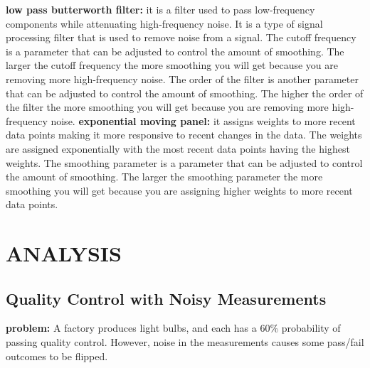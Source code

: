 \documentclass[a4paper,12pt]{article} %
\begin{document}
\newline\newline
\textbf{low pass butterworth filter:} it is a filter used to pass low-frequency components while attenuating high-frequency noise. It is a type of signal processing filter that is used to remove noise from a signal. The cutoff frequency is a parameter that can be adjusted to control the amount of smoothing. The larger the cutoff frequency the more smoothing you will get because you are removing more high-frequency noise. The order of the filter is another parameter that can be adjusted to control the amount of smoothing. The higher the order of the filter the more smoothing you will get because you are removing more high-frequency noise. 
\newline\newline
\textbf{exponential moving panel:} it assigns weights to more recent data points making it more responsive to recent changes in the data. The weights are assigned exponentially with the most recent data points having the highest weights. The smoothing parameter is a parameter that can be adjusted to control the amount of smoothing. The larger the smoothing parameter the more smoothing you will get because you are assigning higher weights to more recent data points.
\section{ANALYSIS}
\subsection{Quality Control with Noisy Measurements}
\textbf{problem: }A factory produces light bulbs, and each has a 60\% probability of passing
quality control. However, noise in the measurements causes some pass/fail outcomes to
be flipped.
\end{document}
